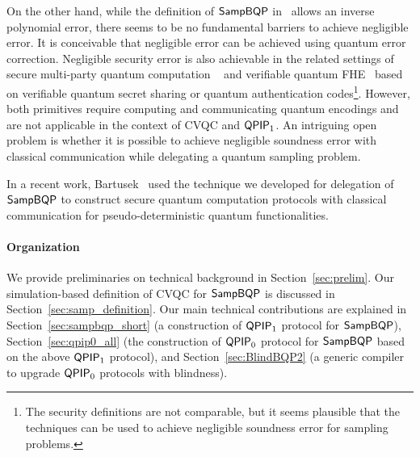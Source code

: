 On the other hand, while the definition of $\operatorname{\mathsf{SampBQP}}$ in~\cite{aaronson_2013, Boson} allows an inverse polynomial error, there seems to be no fundamental barriers to achieve negligible error. It is conceivable that negligible error can be achieved using quantum error correction. Negligible security error is also achievable in the related settings of secure multi-party quantum computation ~\cite{CGS02,DNS12} and verifiable quantum FHE~\cite{ADSS17} based on verifiable quantum secret sharing or quantum authentication codes\footnote{The security definitions are not comparable, but it seems plausible that the techniques can be used to achieve negligible soundness error for sampling problems.}. However, both primitives require computing and communicating quantum encodings and are not applicable in the context of CVQC and $\operatorname{\mathsf{QPIP}}_1$. An intriguing open problem is whether it is possible to achieve negligible soundness error with classical communication while delegating a quantum sampling problem.

In a recent work, Bartusek~\cite{bartuseksecure} used the technique we developed for delegation of $\operatorname{\mathsf{SampBQP}}$ to construct secure quantum computation protocols with classical communication for pseudo-deterministic quantum functionalities.

\paragraph{Organization}
We provide preliminaries on technical background in Section~\ref{sec:prelim}. 
Our simulation-based definition of CVQC for $\operatorname{\mathsf{SampBQP}}$ is discussed in Section~\ref{sec:samp_definition}. 
Our main technical contributions are explained in Section~\ref{sec:sampbqp_short} (a construction of $\operatorname{\mathsf{QPIP}}_1$ protocol for $\operatorname{\mathsf{SampBQP}}$), 
Section~\ref{sec:qpip0_all} (the construction of $\operatorname{\mathsf{QPIP}}_0$ protocol for $\operatorname{\mathsf{SampBQP}}$ based on the above $\operatorname{\mathsf{QPIP}}_1$ protocol), 
and Section~\ref{sec:BlindBQP2} (a generic compiler to upgrade $\operatorname{\mathsf{QPIP}}_0$ protocols with blindness). 
